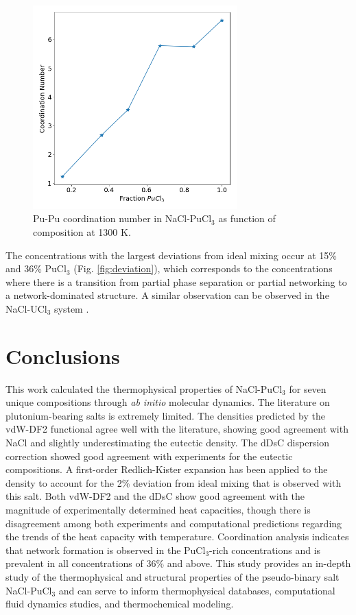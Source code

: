 \documentclass[review]{elsarticle}
\begin{document}
\begin{figure}[h!]
 \centering
 \includegraphics[width=0.7\textwidth]{coordination_number.png} 
 \caption{Pu-Pu coordination number in NaCl-PuCl$_3$ as function of composition at 1300 K.}
 \label{fig:coordination_number}
\end{figure}

The concentrations with the largest deviations from ideal mixing occur at 15\% and 36\% PuCl$_3$ (Fig. \ref{fig:deviation}), which corresponds to the concentrations where there is a transition from partial phase separation or partial networking to a network-dominated structure. A similar observation can be observed in the NaCl-UCl$_3$ system \cite{ANDERSSON2022153836}.
\

\FloatBarrier

\section{Conclusions}
This work calculated the thermophysical properties of NaCl-PuCl$_3$ for seven unique compositions through \textit{ab initio} molecular dynamics. The literature on plutonium-bearing salts is extremely limited. The densities predicted by the vdW-DF2 functional agree well with the literature, showing good agreement with NaCl and slightly underestimating the eutectic density. The dDsC dispersion correction showed good agreement with experiments for the eutectic compositions. A first-order Redlich-Kister expansion has been applied to the density to account for the 2\% deviation from ideal mixing that is observed with this salt. Both vdW-DF2 and the dDsC show good agreement with the magnitude of experimentally determined heat capacities, though there is disagreement among both experiments and computational predictions regarding the trends of the heat capacity with temperature. Coordination analysis indicates that network formation is observed in the PuCl$_3$-rich concentrations and is prevalent in all concentrations of 36\% and above. This study provides an in-depth study of the thermophysical and structural properties of the pseudo-binary salt NaCl-PuCl$_3$ and can serve to inform thermophysical databases, computational fluid dynamics studies, and thermochemical modeling.
\end{document}
